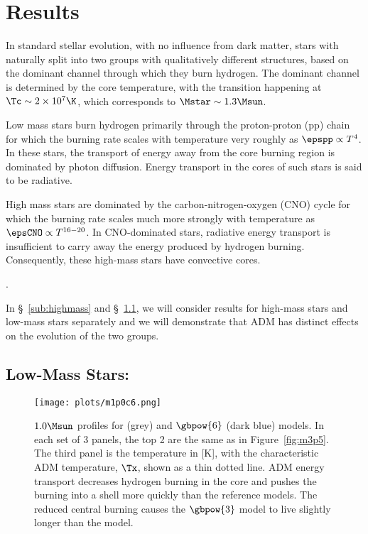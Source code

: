 \section{Results}
\label{sec:results}

In standard stellar evolution, with no influence from dark matter, stars with \mrange naturally split into two groups with qualitatively different structures, based on the dominant channel through which they burn hydrogen. The dominant channel is determined by the core temperature, with the transition happening at $\Tc \sim 2 \times 10^7 \K$, which corresponds to $\Mstar \sim1.3 \Msun$.

Low mass stars burn hydrogen primarily through the proton-proton (pp) chain for which the burning rate scales with temperature very roughly as $\epspp \propto T^4$. In these stars, the transport of energy away from the core burning region is dominated by photon diffusion. Energy transport in the cores of such stars is said to be radiative.

High mass stars are dominated by the carbon-nitrogen-oxygen (CNO) cycle for which the burning rate scales much more strongly with temperature as $\epsCNO \propto T^{16-20}$. In CNO-dominated stars, radiative energy transport is insufficient to carry away the energy produced by hydrogen burning. Consequently, these high-mass stars have convective cores.

.

In \S~\ref{sub:highmass} and \S~\ref{sub:lowmass}, we will consider results for high-mass stars and low-mass stars separately and we will demonstrate that ADM has distinct effects on the evolution of the two groups.

\subsection{Low-Mass Stars: \mrangelow}
\label{sub:lowmass}

  \begin{figure}
    \centering
    \texttt{[image: plots/m1p0c6.png]}
    \caption{$1.0 \Msun$ profiles for \nodm (grey) and $\gbpow{6}$ (dark blue) models. In each set of 3 panels, the top 2 are the same as in Figure~\ref{fig:m3p5}. The third panel is the temperature in [K], with the characteristic ADM temperature, $\Tx$, shown as a thin dotted line. ADM energy transport decreases hydrogen burning in the core and pushes the burning into a shell more quickly than the reference models. The reduced central burning causes the $\gbpow{3}$ model to live slightly longer than the \nodm model.
    }
    \label{fig:m1p0c6}
  \end{figure}


